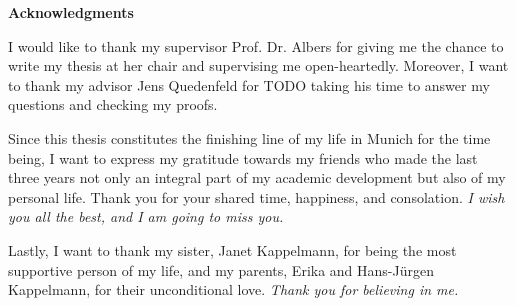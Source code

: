 \thispagestyle{empty}
\vspace*{20mm}

\begin{center}
\textbf{{Acknowledgments}}
\end{center}

\vspace{10mm}
I would like to thank my supervisor Prof. Dr. Albers for giving me the chance to write my thesis at her chair and supervising me open-heartedly. Moreover, I want to thank my advisor Jens Quedenfeld for TODO taking his time to answer my questions and checking my proofs.

Since this thesis constitutes the finishing line of my life in Munich for the time being, I want to express my gratitude towards my friends who made the last three years not only an integral part of my academic development but also of my personal life. Thank you for your shared time, happiness, and consolation. \emph{I wish you all the best, and I am going to miss you.}

Lastly, I want to thank my sister, Janet Kappelmann, for being the most supportive person of my life, and my parents, Erika and Hans-Jürgen Kappelmann, for their unconditional love. \emph{Thank you for believing in me.}

\cleardoublepage{}
